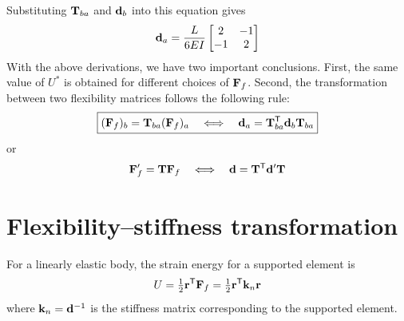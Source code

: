 Substituting $\mathbf{T}_{ba}$ and $\mathbf{d}_b$ into this equation gives
\begin{equation*}
  \mathbf{d}_a = \frac{L}{6EI}\begin{bmatrix}2 & -1\\ -1 & 2\end{bmatrix}
\end{equation*}
With the above derivations, we have two important conclusions. First, the same value of $U^*$ is obtained for different choices of $\mathbf{F}_f$. Second, the transformation between two flexibility matrices follows the following rule:
\begin{equation}
  \boxed{(\mathbf{F}_f)_b = \mathbf{T}_{ba}(\mathbf{F}_f)_a\quad\Longleftrightarrow\quad\mathbf{d}_a = \mathbf{T}_{ba}^{\mathsf{T}}\mathbf{d}_b\mathbf{T}_{ba}}
\end{equation}
or
\begin{equation}
  \mathbf{F}_f' = \mathbf{T}\mathbf{F}_f\quad\Longleftrightarrow\quad\mathbf{d} = \mathbf{T}^{\mathsf{T}}\mathbf{d}'\mathbf{T}
\end{equation}

\section{Flexibility--stiffness transformation}
For a linearly elastic body, the strain energy for a supported element is
\begin{equation}
  U = \tfrac12\mathbf{r}^{\mathsf{T}}\mathbf{F}_f = \tfrac12\mathbf{r}^{\mathsf{T}}\mathbf{k}_n\mathbf{r}
\end{equation}
where $\mathbf{k}_n = \mathbf{d}^{-1}$ is the stiffness matrix corresponding to the supported element.

